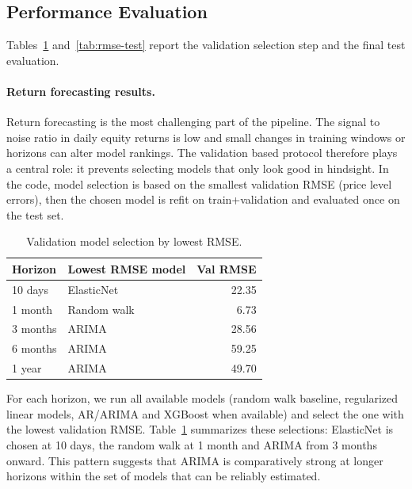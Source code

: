 \documentclass[11pt,a4paper]{article}
\begin{document}
\subsection{Performance Evaluation}
Tables~\ref{tab:rmse-validation} and~\ref{tab:rmse-test} report the validation selection step and the final test evaluation.

\paragraph{Return forecasting results.}
Return forecasting is the most challenging part of the pipeline. The signal to noise ratio in daily equity returns is low and small changes in training windows or horizons can alter model rankings. The validation based protocol therefore plays a central role: it prevents selecting models that only look good in hindsight. In the code, model selection is based on the smallest validation RMSE (price level errors), then the chosen model is refit on train+validation and evaluated once on the test set.

\begin{table}[H]
\centering
\footnotesize
\setlength{\tabcolsep}{4pt}
\renewcommand{\arraystretch}{1.0}
\caption{Validation model selection by lowest RMSE.}
\label{tab:rmse-validation}
\begin{tabular}{l l r}
\toprule
Horizon & Lowest RMSE model & Val RMSE \\
\midrule
10 days  & ElasticNet & 22.35 \\
1 month  & Random walk & 6.73 \\
3 months & ARIMA & 28.56 \\
6 months & ARIMA & 59.25 \\
1 year   & ARIMA & 49.70 \\
\bottomrule
\end{tabular}
\end{table}

\noindent For each horizon, we run all available models (random walk baseline, regularized linear models, AR/ARIMA and XGBoost when available) and select the one with the lowest validation RMSE. Table~\ref{tab:rmse-validation} summarizes these selections: ElasticNet is chosen at 10 days, the random walk at 1 month and ARIMA from 3 months onward. This pattern suggests that ARIMA is comparatively strong at longer horizons within the set of models that can be reliably estimated.
\end{document}
